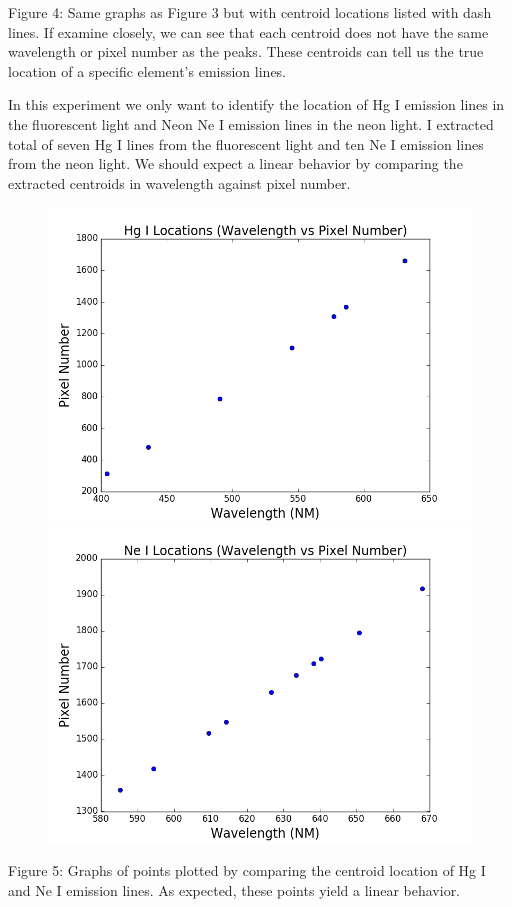 \documentclass[onecolumn, 12pt, a4paper]{article}
\begin{document}
  \newline
\begin{flushleft}
Figure 4: Same graphs as Figure 3 but with centroid locations listed with dash lines. If examine closely, we can see that each centroid does not have the same wavelength or pixel number as the peaks. These centroids can tell us the true location of a specific element's emission lines.
\end{flushleft}
\newline
In this experiment we only want to identify the location of Hg I emission lines in the fluorescent light and Neon Ne I emission lines in the neon light. I extracted total of seven Hg I lines from the fluorescent light and ten Ne I emission lines from the neon light. We should expect a linear behavior by comparing the extracted centroids in wavelength against pixel number.

\begin{subfigure}{\linewidth}\hspace*{-1.3cm}
\includegraphics[width=.55\linewidth]{Hg1loc.png}
\includegraphics[width=.55\linewidth]{Ne1loc.png}
\end{subfigure}\par\medskip
\newline
\begin{flushleft}
Figure 5: Graphs of points plotted by comparing the centroid location of Hg I and Ne I emission lines. As expected, these points yield a linear behavior. 
\end{flushleft}
\end{document}
